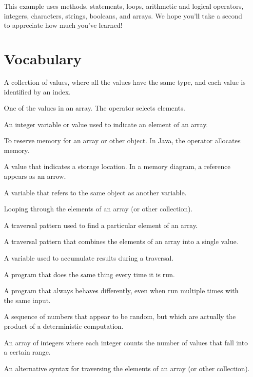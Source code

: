
This example uses methods,  statements,  loops, arithmetic and logical operators, integers, characters, strings, booleans, and arrays.
We hope you'll take a second to appreciate how much you've learned!



\section{Vocabulary}

\begin{description}

A collection of values, where all the values have the same type, and each value is identified by an index.

One of the values in an array.
The \java{[]} operator selects elements.

An integer variable or value used to indicate an element of an array.

To reserve memory for an array or other object.
In Java, the  operator allocates memory.

A value that indicates a storage location.
In a memory diagram, a reference appears as an arrow.

A variable that refers to the same object as another variable.

Looping through the elements of an array (or other collection).

A traversal pattern used to find a particular element of an array.

A traversal pattern that combines the elements of an array into a single value.

A variable used to accumulate results during a traversal.

A program that does the same thing every time it is run.

A program that always behaves differently, even when run multiple times with the same input.

A sequence of numbers that appear to be random, but which are actually the product of a deterministic computation.

An array of integers where each integer counts the number of values that fall into a certain range.

An alternative syntax for traversing the elements of an array (or other collection).

\end{description}



